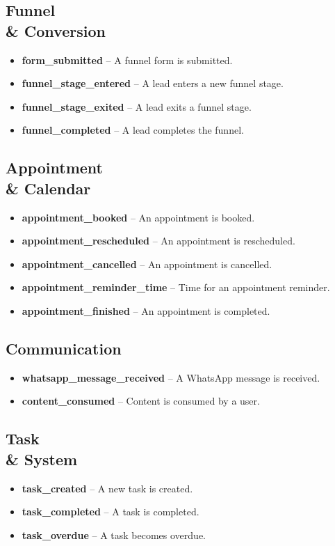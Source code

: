\documentclass[12pt,a4paper]{article}
\begin{document}
\subsection*{Funnel \\& Conversion}
\begin{itemize}[leftmargin=2em]
    \item \textbf{form\_submitted} -- A funnel form is submitted.
    \item \textbf{funnel\_stage\_entered} -- A lead enters a new funnel stage.
    \item \textbf{funnel\_stage\_exited} -- A lead exits a funnel stage.
    \item \textbf{funnel\_completed} -- A lead completes the funnel.
\end{itemize}

\subsection*{Appointment \\& Calendar}
\begin{itemize}[leftmargin=2em]
    \item \textbf{appointment\_booked} -- An appointment is booked.
    \item \textbf{appointment\_rescheduled} -- An appointment is rescheduled.
    \item \textbf{appointment\_cancelled} -- An appointment is cancelled.
    \item \textbf{appointment\_reminder\_time} -- Time for an appointment reminder.
    \item \textbf{appointment\_finished} -- An appointment is completed.
\end{itemize}

\subsection*{Communication}
\begin{itemize}[leftmargin=2em]
    \item \textbf{whatsapp\_message\_received} -- A WhatsApp message is received.
    \item \textbf{content\_consumed} -- Content is consumed by a user.
\end{itemize}

\subsection*{Task \\& System}
\begin{itemize}[leftmargin=2em]
    \item \textbf{task\_created} -- A new task is created.
    \item \textbf{task\_completed} -- A task is completed.
    \item \textbf{task\_overdue} -- A task becomes overdue.
\end{itemize}
\end{document}
